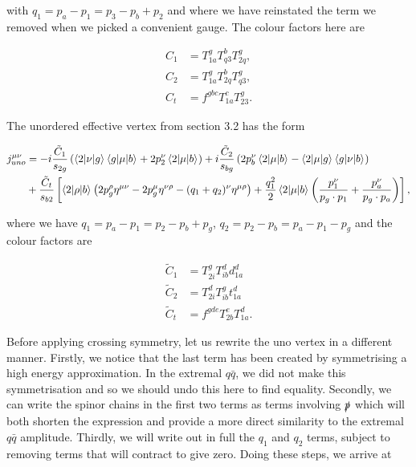 with $q_1 = p_a - p_1 = p_3 - p_b + p_2$ and where we have reinstated the term we removed when we picked a convenient gauge. The colour factors here are

\begin{equation}
\begin{split}
C_1 &= T^g_{1a} T^b_{q3}T^g_{2q}, \\
C_2 &= T^g_{1a} T^b_{2q}T^g_{q3}, \\
C_t &= f^{gbc}T^c_{1a}T^g_{23}.
\end{split}
\end{equation}

The unordered effective vertex from section 3.2 has the form

\begin{equation}
\begin{split}
j_{uno}^{\mu \nu} &= -i \frac{\tilde{C}_1}{s_{2g}} \left(\mathinner{\langle2\vert\nu\vert g\rangle}_{}\mathinner{\langle g\vert\mu\vert b\rangle}_{} + 2p_2^\nu \mathinner{\langle2\vert\mu\vert b\rangle}_{} \right) + i \frac{\tilde{C}_2}{s_{bg}} \left(2p_b^\nu \mathinner{\langle2\vert\mu\vert b\rangle}_{} - \mathinner{\langle2\vert\mu\vert g\rangle}_{} \mathinner{\langle g\vert\nu\vert b\rangle}_{} \right) \\
&+ \frac{\tilde{C}_t}{s_{b2}} \left[\mathinner{\langle2\vert\rho\vert b\rangle}_{} \left(2p_g^\rho \eta^{\mu \nu} - 2 p_g^\mu \eta^{\nu \rho} - (q_1 + q_2)^\nu \eta^{\mu \rho} \right) + \frac{q_1^2}{2} \mathinner{\langle2\vert\mu\vert b\rangle}_{} \left(\frac{p_1^\nu}{p_g \cdot p_1} + \frac{p_a^\nu}{p_g \cdot p_a} \right) \right],
\end{split}
\end{equation}

where we have $q_1 = p_a - p_1 = p_2 - p_b + p_g$, $q_2 = p_2 - p_b = p_a - p_1 - p_g$ and the colour factors are

\begin{equation}
\begin{split}
\tilde{C}_1 &= T_{2i}^g T_{ib}^d d^d_{1a} \\
\tilde{C}_2 &= T^d_{2i} T_{ib}^g t_{1a}^d \\
\tilde{C}_t &= f^{gde}T^e_{2b}T^d_{1a}.
\end{split}
\end{equation}

Before applying crossing symmetry, let us rewrite the uno vertex in a different manner. Firstly, we notice that the last term has been created by symmetrising a high energy approximation. In the extremal $q\bar{q}$, we did not make this symmetrisation  and so we should undo this here to find equality. Secondly, we can write the spinor chains in the first two terms as terms involving $\slashed{p}$ which will both shorten the expression and provide a more direct similarity to the extremal $q\bar{q}$ amplitude. Thirdly, we will write out in full the $q_1$ and $q_2$ terms, subject to removing terms that will contract to give zero. Doing these steps, we arrive at

